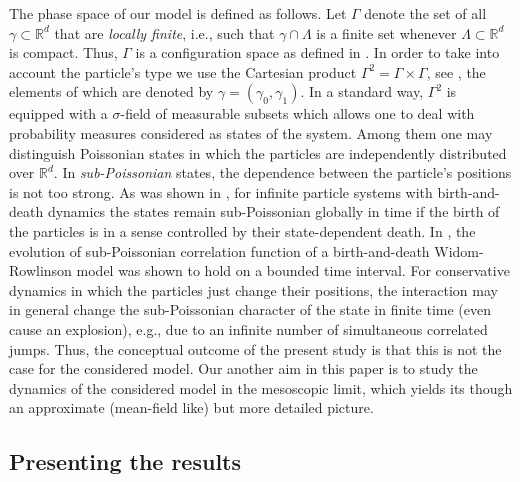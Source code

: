 \documentclass[reqno,11pt]{amsart}
\theoremstyle{definition}
\theoremstyle{remark}
\numberwithin{equation}{section}
\begin{document}
The phase space of our model is defined as follows. Let $\Gamma$
denote the set of all  $\gamma \subset \mathds{R}^d$ that are {\it
locally finite}, i.e., such that $\gamma\cap\Lambda$ is a finite set
whenever $\Lambda \subset \mathds{R}^d$ is compact. Thus, $\Gamma$
is a configuration space as defined in \cite{Albev,BKKK,FKO,Tobi}.
In order to take into account the particle's type we use the
Cartesian product $\Gamma^2 = \Gamma \times \Gamma$, see
\cite{F,FKKO,FKO1}, the elements of which are denoted by $\gamma =
(\gamma_0, \gamma_1)$. In a standard way, $\Gamma^2$ is equipped
with a $\sigma$-field of measurable subsets which allows one to deal
with probability measures considered as states of the system. Among
them one may distinguish Poissonian states in which the particles
are independently distributed over $\mathds{R}^d$. In
\emph{sub-Poissonian} states, the dependence between the particle's
positions  is not too strong. As was shown in \cite{KK}, for
infinite particle systems with birth-and-death dynamics the states
remain sub-Poissonian globally in time if the birth of the particles
is in a sense controlled by their state-dependent death. In
\cite{FKKO}, the evolution of sub-Poissonian correlation function of
a birth-and-death Widom-Rowlinson model was shown to hold on a
bounded time interval. For conservative dynamics in which the
particles just change their positions, the interaction may in
general change the sub-Poissonian character of the state in finite
time (even cause an explosion), e.g., due to an infinite number of
simultaneous correlated jumps.   Thus, the conceptual outcome of the
present study is that this is not the case for the considered model.
Our another aim in this paper is to study the dynamics of the
considered model in the mesoscopic limit, which yields its though an
approximate (mean-field like) but more detailed picture.

\subsection{Presenting the results}
\end{document}
